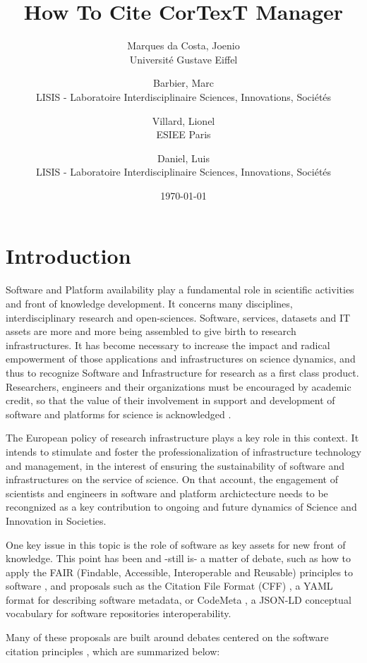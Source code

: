 \documentclass{article}
\title{
  How To Cite CorTexT Manager
}
\author{
  Marques da Costa, Joenio\\
  Université Gustave Eiffel
  \and
  Barbier, Marc\\
  LISIS - Laboratoire Interdisciplinaire Sciences, Innovations, Sociétés
  \and
  Villard, Lionel\\
  ESIEE Paris
  \and
  Daniel, Luis\\
  LISIS - Laboratoire Interdisciplinaire Sciences, Innovations, Sociétés
}
\date{\today}
\begin{document}
\maketitle

\section{Introduction}

Software and Platform availability play a fundamental role in scientific
activities and front of knowledge development. It concerns many disciplines,
interdisciplinary research and open-sciences. Software, services, datasets and
IT assets are more and more being assembled to give birth to research
infrastructures.  It has become necessary to increase the impact and radical
empowerment of those applications and infrastructures on science dynamics, and
thus to recognize Software and Infrastructure for research as a first class
product. Researchers, engineers and their organizations must be encouraged by
academic credit, so that the value of their involvement in support and
development of software and platforms for science is acknowledged
\cite{alliez_attributing_2020}.

The European policy of research infrastructure plays a key role in this context. It intends to stimulate and foster the professionalization of infrastructure technology and management, in the interest of ensuring the sustainability of software and infrastructures on the service of science. On that account, the engagement of scientists and engineers in software and platform archictecture needs to be recongnized as a
key contribution to ongoing and future dynamics of Science and Innovation in
Societies.

One key issue in this topic is the role of software as key assets for new
front of knowledge. This point has been and -still is- a matter of debate,
such as how to apply the FAIR (Findable, Accessible, Interoperable and
Reusable) principles to software \cite{noauthor_fair_nodate}, and proposals
such as the Citation File Format (CFF) \cite{chue_hong_software_2019}, a YAML
format for describing software metadata, or CodeMeta
\cite{druskat_citation_2019}, a JSON-LD conceptual vocabulary for software
repositories interoperability.

Many of these proposals are built around debates centered on the software
citation principles \cite{smith_software_2016}, which are summarized below:
\end{document}
